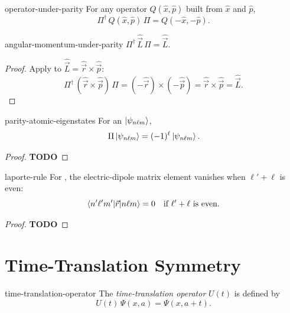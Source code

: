 \documentclass[12pt]{article}
\begin{document}
\begin{thm}{operator-under-parity}
  For any operator $Q(\hat{x}, \hat{p})$ built from $\hat{x}$ and $\hat{p}$,
  \[
    \Pi^{\dagger}\,Q(\hat{x}, \hat{p})\,\Pi = Q(-\hat{x}, -\hat{p}).
  \]
\end{thm}

\begin{thm}{angular-momentum-under-parity}
  $\Pi^{\dagger}\,\hat{\vec{L}}\,\Pi = \hat{\vec{L}}$.
\end{thm}

\begin{proof}
  Apply  to $\hat{\vec{L}} = \hat{\vec{r}} \times \hat{\vec{p}}$:
  \[
    \Pi^{\dagger}\,(\hat{\vec{r}} \times \hat{\vec{p}})\,\Pi = (-\hat{\vec{r}}) \times (-\hat{\vec{p}}) = \hat{\vec{r}} \times \hat{\vec{p}} = \hat{\vec{L}}.
  \]
\end{proof}

\begin{thm}{parity-atomic-eigenstates}
  For an  $\ket{\psi_{n\ell m}}$,
  \[
    \Pi \ket{\psi_{n\ell m}} = (-1)^\ell \ket{\psi_{n\ell m}}.
  \]
\end{thm}

\begin{proof}
  {\color{blue}\textbf{TODO}}
\end{proof}

\begin{thm}{laporte-rule}
  For , the electric-dipole matrix element vanishes when $\ell' + \ell$ is even:
  \[
    \braket{n'\ell'm' | \vec{r} | n\ell m} = 0 \quad \text{if } \ell' + \ell \text{ is even}.
  \]
\end{thm}

\begin{proof}
  {\color{blue}\textbf{TODO}}
\end{proof}

\section{Time-Translation Symmetry}

\begin{dfn}{time-translation-operator}
  The \emph{time-translation operator} $U(t)$ is defined by
  \[U(t)\,\Psi(x, a) = \Psi(x, a + t).\]
\end{dfn}
\end{document}
